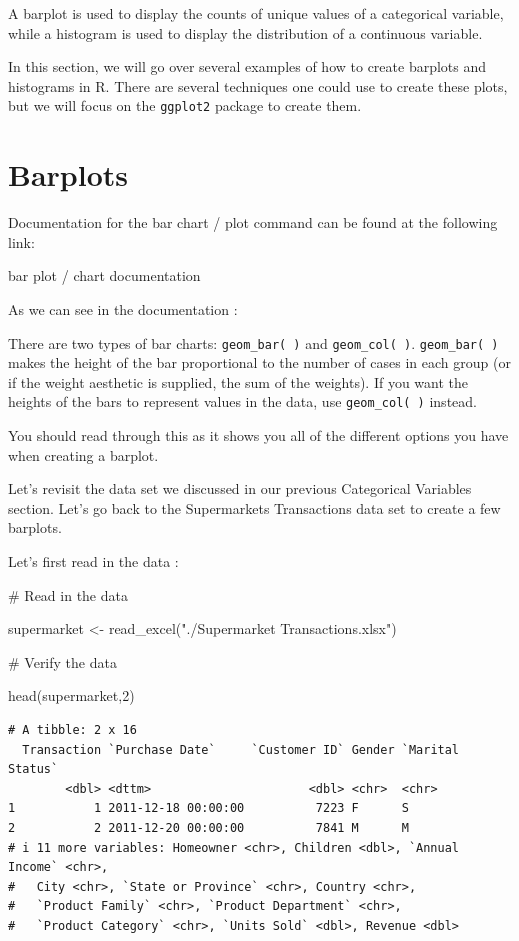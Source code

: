 \documentclass[
  letterpaper,
  DIV=11,
  numbers=noendperiod]{scrreprt}
\newenvironment{Shaded}{\begin{snugshade}}{\end{snugshade}}
\newcommand{\CommentTok}[1]{\textcolor[rgb]{0.37,0.37,0.37}{#1}}
\newcommand{\DecValTok}[1]{\textcolor[rgb]{0.68,0.00,0.00}{#1}}
\newcommand{\FunctionTok}[1]{\textcolor[rgb]{0.28,0.35,0.67}{#1}}
\newcommand{\NormalTok}[1]{\textcolor[rgb]{0.00,0.23,0.31}{#1}}
\newcommand{\OtherTok}[1]{\textcolor[rgb]{0.00,0.23,0.31}{#1}}
\newcommand{\StringTok}[1]{\textcolor[rgb]{0.13,0.47,0.30}{#1}}
\begin{document}
A barplot is used to display the counts of unique values of a
categorical variable, while a histogram is used to display the
distribution of a continuous variable.

In this section, we will go over several examples of how to create
barplots and histograms in R. There are several techniques one could use
to create these plots, but we will focus on the \texttt{ggplot2} package
to create them.

\section*{Barplots}\label{barplots}


Documentation for the bar chart / plot command can be found at the
following link:

bar plot / chart documentation

As we can see in the documentation :

There are two types of bar charts: \texttt{geom\_bar(\ )} and
\texttt{geom\_col(\ )}. \texttt{geom\_bar(\ )} makes the height of the
bar proportional to the number of cases in each group (or if the weight
aesthetic is supplied, the sum of the weights). If you want the heights
of the bars to represent values in the data, use \texttt{geom\_col(\ )}
instead.

You should read through this as it shows you all of the different
options you have when creating a barplot.

Let's revisit the data set we discussed in our previous Categorical
Variables section. Let's go back to the Supermarkets Transactions data
set to create a few barplots.

Let's first read in the data :

\begin{Shaded}
\begin{Highlighting}[]
\CommentTok{\# Read in the data}

\NormalTok{supermarket }\OtherTok{\textless{}{-}} \FunctionTok{read\_excel}\NormalTok{(}\StringTok{"./Supermarket Transactions.xlsx"}\NormalTok{)}

\CommentTok{\# Verify the data}

\FunctionTok{head}\NormalTok{(supermarket,}\DecValTok{2}\NormalTok{)}
\end{Highlighting}
\end{Shaded}

\begin{verbatim}
# A tibble: 2 x 16
  Transaction `Purchase Date`     `Customer ID` Gender `Marital Status`
        <dbl> <dttm>                      <dbl> <chr>  <chr>           
1           1 2011-12-18 00:00:00          7223 F      S               
2           2 2011-12-20 00:00:00          7841 M      M               
# i 11 more variables: Homeowner <chr>, Children <dbl>, `Annual Income` <chr>,
#   City <chr>, `State or Province` <chr>, Country <chr>,
#   `Product Family` <chr>, `Product Department` <chr>,
#   `Product Category` <chr>, `Units Sold` <dbl>, Revenue <dbl>
\end{verbatim}
\end{document}
